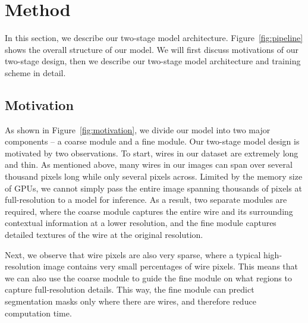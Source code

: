 \section{Method} \label{sec:method}





In this section, we describe our two-stage model architecture. Figure~\ref{fig:pipeline} shows the overall structure of our model. We will first discuss motivations of our two-stage design, then we describe our two-stage model architecture and training scheme in detail.

\subsection{Motivation}

As shown in Figure~\ref{fig:motivation}, we divide our model into two major components -- a coarse module and a fine module. Our two-stage model design is motivated by two observations. To start, wires in our dataset are extremely long and thin. As mentioned above, many wires in our images can span over several thousand pixels long while only several pixels across. Limited by the memory size of GPUs, we cannot simply pass the entire image spanning thousands of pixels at full-resolution to a model for inference. As a result, two separate modules are required, where the coarse module captures the entire wire and its surrounding contextual information at a lower resolution, and the fine module captures detailed textures of the wire at the original resolution.

Next, we observe that wire pixels are also very sparse, where a typical high-resolution image contains very small percentages of wire pixels. This means that we can also use the coarse module to guide the fine module on what regions to capture full-resolution details. This way, the fine module can predict segmentation masks only where there are wires, and therefore reduce computation time.

